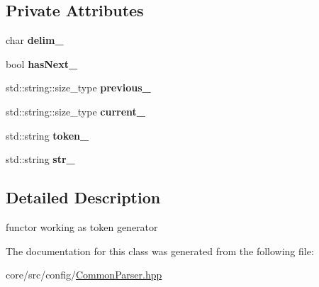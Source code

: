 \subsection*{Private Attributes}
\begin{DoxyCompactItemize}
\item 
\hypertarget{classSplitter_a3b7c9064cca2361c0388395b38bec579}{
char {\bfseries delim\_\-}}
\label{classSplitter_a3b7c9064cca2361c0388395b38bec579}

\item 
\hypertarget{classSplitter_a1029aba99a088cfcf5936f9c921b4e76}{
bool {\bfseries hasNext\_\-}}
\label{classSplitter_a1029aba99a088cfcf5936f9c921b4e76}

\item 
\hypertarget{classSplitter_aeba274b41ab41513486c1dacc87acb9b}{
std::string::size\_\-type {\bfseries previous\_\-}}
\label{classSplitter_aeba274b41ab41513486c1dacc87acb9b}

\item 
\hypertarget{classSplitter_a582ea00d95874fd70cbcf3af257ac886}{
std::string::size\_\-type {\bfseries current\_\-}}
\label{classSplitter_a582ea00d95874fd70cbcf3af257ac886}

\item 
\hypertarget{classSplitter_a2c4ef94b3d44dff8604cf8611dbef46d}{
std::string {\bfseries token\_\-}}
\label{classSplitter_a2c4ef94b3d44dff8604cf8611dbef46d}

\item 
\hypertarget{classSplitter_a80aa982eb34b28760671c3033e0092b0}{
std::string {\bfseries str\_\-}}
\label{classSplitter_a80aa982eb34b28760671c3033e0092b0}

\end{DoxyCompactItemize}


\subsection{Detailed Description}
functor working as token generator 

The documentation for this class was generated from the following file:\begin{DoxyCompactItemize}
\item 
core/src/config/\hyperlink{CommonParser_8hpp}{CommonParser.hpp}\end{DoxyCompactItemize}
